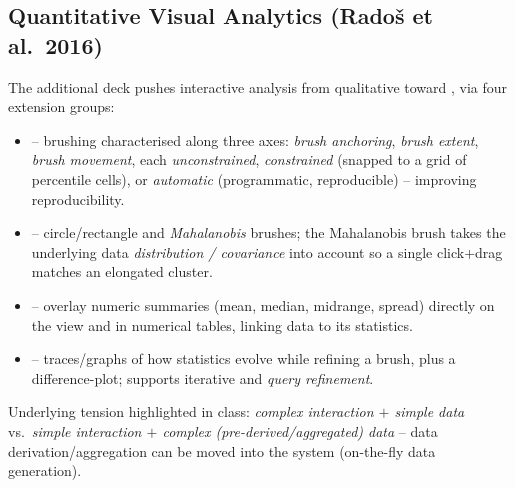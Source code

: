 \subsection{Quantitative Visual Analytics (Rado\v{s} et al.\ 2016)}
The additional deck pushes interactive analysis from qualitative toward , via four extension groups:
\begin{itemize}
  \item {} -- brushing characterised along three axes: \emph{brush anchoring}, \emph{brush extent}, \emph{brush movement}, each \emph{unconstrained}, \emph{constrained} (snapped to a grid of percentile cells), or \emph{automatic} (programmatic, reproducible) -- improving reproducibility.
  \item {} -- circle/rectangle and \emph{Mahalanobis} brushes; the Mahalanobis brush takes the underlying data \emph{distribution / covariance} into account so a single click+drag matches an elongated cluster.
  \item {} -- overlay numeric summaries (mean, median, midrange, spread) directly on the view and in numerical tables, linking data to its statistics.
  \item {} -- traces/graphs of how statistics evolve while refining a brush, plus a difference-plot; supports iterative  and \emph{query refinement}.
\end{itemize}
Underlying tension highlighted in class: \emph{complex interaction $+$ simple data} vs.\ \emph{simple interaction $+$ complex (pre-derived/aggregated) data} -- data derivation/aggregation can be moved into the system (on-the-fly data generation).


